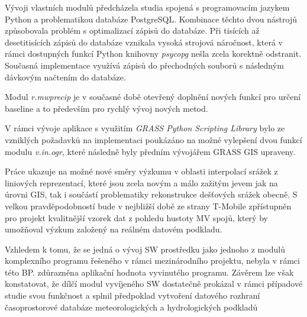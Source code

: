 \documentclass[a4paper,12pt,oneside]{report}
\begin{document}
Vývoji vlastních modulů předcházela studia spojená s programovacím
jazykem Python a problematikou databáze PostgreSQL. Kombinace těchto
dvou nástrojů způsobovala problém s optimalizací zápisů do databáze.
Při tisících až desetitisících zápisů do databáze vznikala vysoká
strojová náročnost, která v rámci dostupných funkcí Python knihovny
\textit{psycopg} nešla zcela korektně odstranit. Současná implementace
využívá zápisů do přechodných souborů s následným dávkovým načtením do
databáze.

Modul \textit{r.mwprecip} je v současné době otevřený doplnění nových
funkcí pro určení baseline a to především pro rychlý vývoj nových
metod.

V rámci vývoje aplikace s využitím \textit{GRASS Python Scripting
  Library} bylo ze vzniklých požadavků na implementaci poukázáno na
možné vylepšení dvou funkcí modulu \textit{v.in.ogr}, které následně
byly předním vývojářem GRASS GIS upraveny.

Práce ukazuje na možné nové směry výzkumu v oblasti
interpolací srážek z liniových reprezentací, které jsou zcela novým a
málo zažitým jevem jak na úrovni GIS, tak i  součástí problematiky
rekonstrukce dešťových srážek obecně. S velkou pravděpodobností bude v
nejbližší době ze strany T-Mobile zpřístupněn pro projekt kvalitnější
vzorek dat z pohledu hustoty MV spojů, který by umožňoval výzkum
založený na reálném datovém podkladu.

Vzhledem k tomu, že se jedná o vývoj SW prostředku jako jednoho z modulů komplexního programu řešeného v rámci mezinárodního projektu, nebyla v rámci této BP. zdůrazněna aplikační hodnota vyvinutého programu. Závěrem lze však konstatovat, že dílčí modul vyvíjeného SW dostatečně prokázal v rámci případové studie svou funkčnost a splnil předpoklad vytvoření datového rozhraní časoprostorové data\-báze meteorologických a hydrologických podkladů
\end{document}
